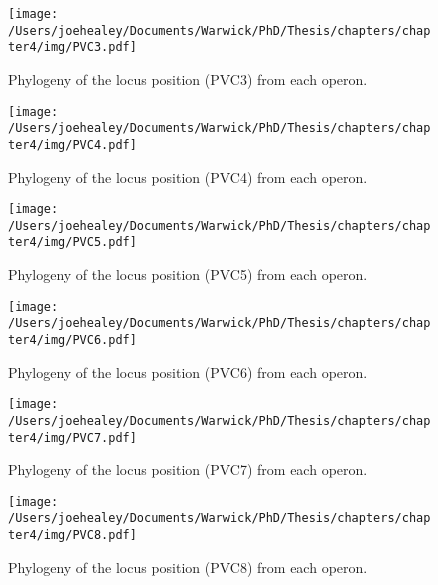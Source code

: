 \newpage

\begin{figure}[h!]
	\centering
	\texttt{[image: /Users/joehealey/Documents/Warwick/PhD/Thesis/chapters/chapter4/img/PVC3.pdf]}
	\captionsetup{singlelinecheck=off, justification=justified, font=footnotesize, aboveskip=19pt}
	\caption{Phylogeny of the locus position (PVC3) from each operon.}
	\label{pvc3tree}
\end{figure}
\hfill
\begin{figure}[h!]
	\centering
	\texttt{[image: /Users/joehealey/Documents/Warwick/PhD/Thesis/chapters/chapter4/img/PVC4.pdf]}
	\captionsetup{singlelinecheck=off, justification=justified, font=footnotesize, aboveskip=19pt}
	\caption{Phylogeny of the locus position (PVC4) from each operon.}
	\label{pvc4tree}
\end{figure}

\newpage

\begin{figure}[h!]
	\centering
	\texttt{[image: /Users/joehealey/Documents/Warwick/PhD/Thesis/chapters/chapter4/img/PVC5.pdf]}
	\captionsetup{singlelinecheck=off, justification=justified, font=footnotesize, aboveskip=19pt}
	\caption{Phylogeny of the locus position (PVC5) from each operon.}
	\label{pvc5tree}
\end{figure}
\hfill
\begin{figure}[h!]
	\centering
	\texttt{[image: /Users/joehealey/Documents/Warwick/PhD/Thesis/chapters/chapter4/img/PVC6.pdf]}
	\captionsetup{singlelinecheck=off, justification=justified, font=footnotesize, aboveskip=19pt}
	\caption{Phylogeny of the locus position (PVC6) from each operon.}
	\label{pvc6tree}
\end{figure}

\newpage

\begin{figure}[h!]
	\centering
	\texttt{[image: /Users/joehealey/Documents/Warwick/PhD/Thesis/chapters/chapter4/img/PVC7.pdf]}
	\captionsetup{singlelinecheck=off, justification=justified, font=footnotesize, aboveskip=19pt}
	\caption{Phylogeny of the locus position (PVC7) from each operon.}
	\label{pvc7tree}
\end{figure}
\hfill
\begin{figure}[h!]
	\centering
	\texttt{[image: /Users/joehealey/Documents/Warwick/PhD/Thesis/chapters/chapter4/img/PVC8.pdf]}
	\captionsetup{singlelinecheck=off, justification=justified, font=footnotesize, aboveskip=19pt}
	\caption{Phylogeny of the locus position (PVC8) from each operon.}
	\label{pvc8tree}
\end{figure}

